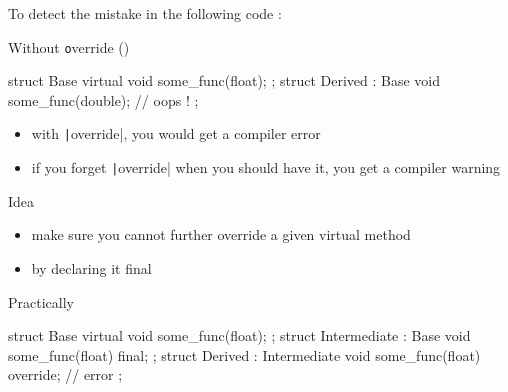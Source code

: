 \begin{frame}[fragile]
  To detect the mistake in the following code :
  \begin{block}{Without {\texttt override} ()}
    \begin{cppcode}
      struct Base {
        virtual void some_func(float);
      };
      struct Derived : Base {
        void some_func(double); // oops !
      };
    \end{cppcode}
  \end{block}
  \begin{itemize}
  \item with \texttt|override|, you would get a compiler error
  \item if you forget \texttt|override| when you should have it, you get a compiler warning
  \end{itemize}
\end{frame}

\begin{advanced}
\begin{frame}[fragile]
  \begin{block}{Idea}
    \begin{itemize}
    \item make sure you cannot further override a given virtual method
    \item by declaring it final
    \end{itemize}
  \end{block}
  \begin{exampleblock}{Practically}
    \begin{cppcode}
      struct Base {
        virtual void some_func(float);
      };
      struct Intermediate : Base {
        void some_func(float) final;
      };
      struct Derived : Intermediate {
        void some_func(float) override; // error
      };
    \end{cppcode}
  \end{exampleblock}
\end{frame}
\end{advanced}

